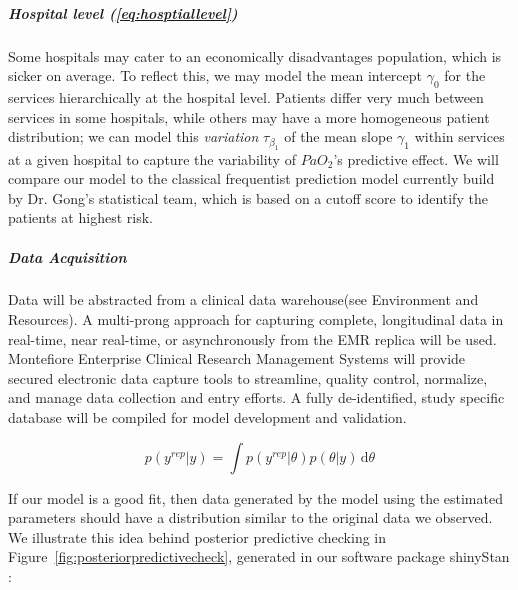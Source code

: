 \documentclass[11pt,notitlepage]{article}
\begin{document}
\subparagraph*{Hospital level (\ref{eq:hosptiallevel})}
Some hospitals may cater to an economically disadvantages population, which is sicker on average. To reflect this, we may  model the mean intercept $\gamma_0$ for the services hierarchically at the hospital level. Patients differ very much between services in some hospitals, while others may have a more homogeneous patient distribution; we can model this \textit{variation} $\tau_{\beta_1}$ of the mean slope $\gamma_1$ within services at a given hospital to capture the variability of $PaO_2$'s predictive effect. We will compare our model to the classical frequentist prediction model currently build by Dr. Gong's statistical team, which is based on a cutoff score to identify the patients at highest risk.

\subparagraph*{Data Acquisition}
Data will be abstracted from a clinical data warehouse(see Environment and Resources). A multi-prong approach for capturing complete, longitudinal data in real-time, near real-time, or asynchronously from the EMR replica will be used. Montefiore Enterprise Clinical Research Management Systems will provide secured electronic data capture tools to streamline, quality control, normalize, and manage data collection and entry efforts. A fully de-identified, study specific database will be compiled for model development and validation.
\begin{figure}
\vspace{-11pt}
\begin{equation} \label{eq:predictivecheck}
 p(y^{rep}|y)  = \int \! p(y^{rep}|\theta) p(\theta|y) \, \mathrm{d}\theta 
\end{equation}
\vspace{-10pt}
\end{figure}
If our model is a good fit, then data generated by the model using the estimated parameters should have a distribution similar to the original data we observed. We illustrate this idea behind posterior predictive checking \cite{Gelman_predictive_2000} in Figure~\ref{fig:posteriorpredictivecheck}, generated in our software package shinyStan \cite{shinystan-software:2015}:
\end{document}
